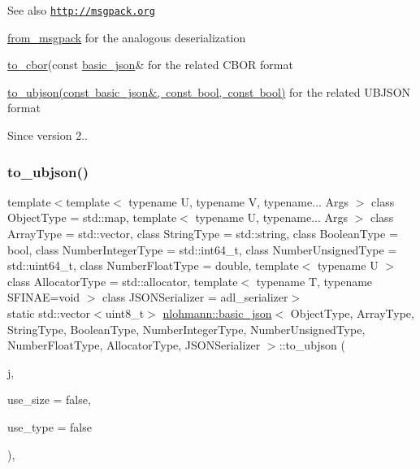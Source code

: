 \begin{DoxySeeAlso}{See also}
\href{http://msgpack.org}{\tt http\+://msgpack.\+org} 

\mbox{\hyperlink{classnlohmann_1_1basic__json_a11458b7982adba51bc634f2f8c961e9b}{from\+\_\+msgpack}} for the analogous deserialization 

\mbox{\hyperlink{classnlohmann_1_1basic__json_a2566783e190dec524bf3445b322873b8}{to\+\_\+cbor}}(const \mbox{\hyperlink{classnlohmann_1_1basic__json}{basic\+\_\+json}}\& for the related C\+B\+OR format 

\mbox{\hyperlink{classnlohmann_1_1basic__json_ae1ece6c2059114eac10873f13ef19185}{to\+\_\+ubjson(const basic\+\_\+json\&, const bool, const bool)}} for the related U\+B\+J\+S\+ON format
\end{DoxySeeAlso}
\begin{DoxySince}{Since}
version 2.. 
\end{DoxySince}
\mbox{\label{classnlohmann_1_1basic__json_ae1ece6c2059114eac10873f13ef19185}} 
\subsubsection{\texorpdfstring{to\+\_\+ubjson()}{to\_ubjson()}}
{\footnotesize\ttfamily template$<$template$<$ typename U, typename V, typename... Args $>$ class Object\+Type = std\+::map, template$<$ typename U, typename... Args $>$ class Array\+Type = std\+::vector, class String\+Type  = std\+::string, class Boolean\+Type  = bool, class Number\+Integer\+Type  = std\+::int64\+\_\+t, class Number\+Unsigned\+Type  = std\+::uint64\+\_\+t, class Number\+Float\+Type  = double, template$<$ typename U $>$ class Allocator\+Type = std\+::allocator, template$<$ typename T, typename S\+F\+I\+N\+A\+E=void $>$ class J\+S\+O\+N\+Serializer = adl\+\_\+serializer$>$ \\
static std\+::vector$<$uint8\+\_\+t$>$ \mbox{\hyperlink{classnlohmann_1_1basic__json}{nlohmann\+::basic\+\_\+json}}$<$ Object\+Type, Array\+Type, String\+Type, Boolean\+Type, Number\+Integer\+Type, Number\+Unsigned\+Type, Number\+Float\+Type, Allocator\+Type, J\+S\+O\+N\+Serializer $>$\+::to\+\_\+ubjson (\begin{DoxyParamCaption}\item[{const \mbox{\hyperlink{classnlohmann_1_1basic__json}{basic\+\_\+json}}$<$ Object\+Type, Array\+Type, String\+Type, Boolean\+Type, Number\+Integer\+Type, Number\+Unsigned\+Type, Number\+Float\+Type, Allocator\+Type, J\+S\+O\+N\+Serializer $>$ \&}]{j,  }\item[{const bool}]{use\+\_\+size = {\ttfamily false},  }\item[{const bool}]{use\+\_\+type = {\ttfamily false} }\end{DoxyParamCaption})\hspace{0.3cm}{\ttfamily [inline]}, {\ttfamily [static]}}




